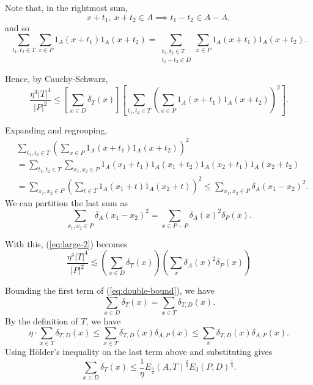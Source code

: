 \documentclass[reqno]{amsart}
\newcommand{\holder}{H\"older}
\numberwithin{equation}{section}
\begin{document}
Note that, in the rightmost sum,
\[
    x + t_1 ,~ x + t_2 \in A \implies  t_1 - t_2 \in A-A
,\]
and so
\[
    \sum _{t_1,t_2 \in T} \sum _{x \in P} 1_{A} (x + t_1) 1_{A} (x + t_2)= \sum _{\substack{ t_1, t_2 \in T \\ t_1 - t_2 \in D }} \sum _{x \in P} 1_{A} (x + t_1)1_{A} (x + t_2)
.\]

Hence, by Cauchy-Schwarz,
\begin{equation} \label{eq:large-2}
    \frac{\eta ^{4}\left\lvert T \right\rvert ^{4}}{\left\lvert P \right\rvert ^{2}} \leq \left[ \sum _{x \in D} \delta_{T } (x) \right] \left[ \sum _{t_1,t_2 \in T}  \left( \sum _{x \in P} 1_{A} (x + t_1)1_{A} (x + t_2) \right) ^{2} \right] .
\end{equation}

Expanding and regrouping,
\begin{align*}
& \sum _{t_1,t_2 \in T } \left( \sum _{x \in P} 1_{A} (x + t_1) 1_{A} (x+t_2) \right) ^{2}\\
& = \sum _{t_1,t_2 \in T } \sum _{x_1,x_2 \in P} 1_{A} (x_1 + t_1)1_{A} (x_1 + t_2) 1_{A} (x_2 + t_1) 1_{A} (x_2 + t_2) \\
& = \sum _{x_1,x_2 \in P} \left( \sum _{t \in T } 1_{A} (x_1 + t) 1_{A} (x_2 + t) \right) ^{2} \leq \sum _{x_1,x_2 \in P} \delta_{A} (x_1-x_2)^{2}.
\end{align*}
We can partition the last sum as
\[
    \sum _{x_1,x_2 \in P} \delta_{A} (x_1 - x_2)^{2} = \sum _{x \in P - P} \delta_{A} (x)^{2} \delta_{P}(x)  
.\]

With this, (\ref{eq:large-2}) becomes
\begin{equation} \label{eq:double-bound}
    \frac{\eta^{4} \left\lvert T  \right\rvert ^{4}}{\left\lvert P \right\rvert ^{2}} \lesssim \left( \sum _{x \in D} \delta_{T} (x)  \right)  \left(  \sum _{x} \delta_{A} (x) ^{2}\delta_{P} (x)  \right) 
\end{equation}

Bounding the first term of (\ref{eq:double-bound}), we have
\[
    \sum _{x \in D} \delta_{T} (x) = \sum _{x \in T} \delta_{T,D} (x)
.\]
By the definition of \(T\), we have
\[
    \eta \cdot \sum _{x \in T} \delta_{T,D} (x) \leq \sum _{x \in T} \delta_{T,D} (x) \delta_{A,P} (x) \leq \sum _{x}  \delta_{T,D} (x) \delta_{A,P} (x)
.\]
Using \holder's inequality on the last term above and substituting gives
\begin{equation} \label{eq:first-term}
    \sum _{x \in D} \delta_{T} (x) \leq \frac{1}{\eta} E_{\frac{3}{2} } (A,T)^{\frac{2}{3} } E_{3} (P,D)^{\frac{1}{3} }.
\end{equation}
\end{document}
